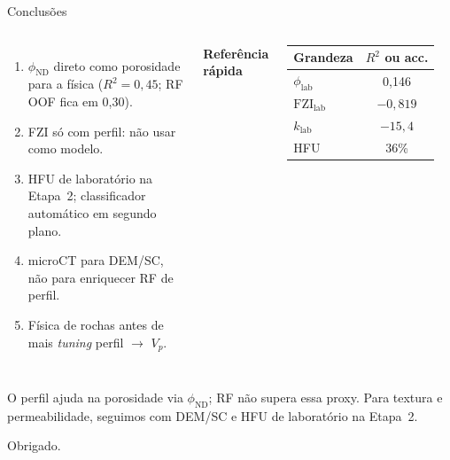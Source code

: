 \documentclass[aspectratio=169,10pt]{beamer}
\newcommand{\philab}{\ensuremath{\phi_{\mathrm{lab}}}}
\newcommand{\fzilab}{\ensuremath{\mathrm{FZI}_{\mathrm{lab}}}}
\newcommand{\klab}{\ensuremath{k_{\mathrm{lab}}}}
\newcommand{\phiND}{\ensuremath{\phi_{\mathrm{ND}}}}
\begin{document}
\begin{frame}{Conclusões}
  \footnotesize
  \begin{columns}[T,onlytextwidth]
    \begin{enumerate}
      \item \phiND{} direto como porosidade para a física ($R^2 = 0{,}45$;
            RF OOF fica em 0,30).
      \item FZI só com perfil: não usar como modelo.
      \item HFU de laboratório na Etapa~2; classificador automático em segundo plano.
      \item microCT para DEM/SC, não para enriquecer RF de perfil.
      \item Física de rochas antes de mais \emph{tuning} perfil $\rightarrow$ $V_p$.
    \end{enumerate}
    \centering
    \textbf{Referência rápida}\\[0.08cm]
    \begin{tabular}{lc}
      \toprule
      Grandeza & $R^2$ ou acc. \\
      \midrule
      \philab & 0,146 \\
      \fzilab & $-0{,}819$ \\
      \klab & $-15{,}4$ \\
      HFU & 36\% \\
      \bottomrule
    \end{tabular}
  \end{columns}
  \vspace{0.12cm}
  \noindent\footnotesize O perfil ajuda na porosidade via \phiND{}; RF não
  supera essa proxy. Para textura e permeabilidade, seguimos com DEM/SC e HFU
  de laboratório na Etapa~2.
  \vspace{0.15cm}
  \begin{center}
    {\small Obrigado.}
  \end{center}
\end{frame}
\end{document}
